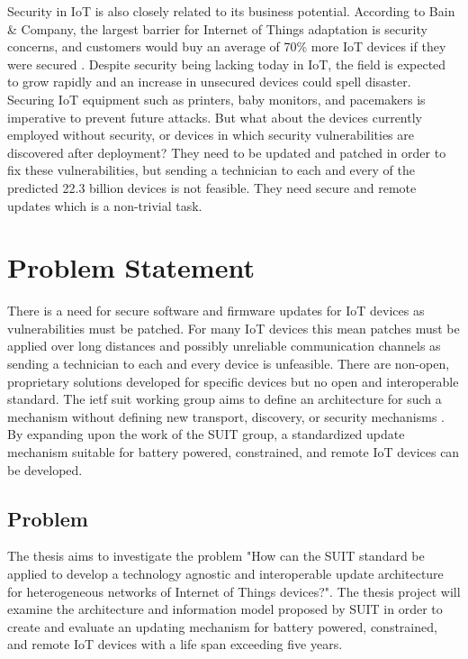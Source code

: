 \documentclass[0-thesis.tex]{subfiles}
\begin{document}
Security in IoT is also closely related to its business potential. According to Bain \&
Company, the largest barrier for Internet of Things adaptation is security concerns, and
customers would buy an average of 70\% more IoT devices if they were secured
\parencite{ali_bosche_ford_2018}. Despite security being lacking today in IoT, the field
is expected to grow rapidly and an increase in unsecured devices could spell disaster.
Securing IoT equipment such as printers, baby monitors, and pacemakers is imperative to
prevent future attacks. But what about the devices currently employed without security, or
devices in which security vulnerabilities are discovered after deployment? They need to be
updated and patched in order to fix these vulnerabilities, but sending a technician to
each and every of the predicted 22.3 billion devices is not feasible. They need secure and
remote updates which is a non-trivial task.

\section{Problem Statement}
\label{sec:problem-statement}
There is a need for secure software and firmware updates for IoT devices as
vulnerabilities must be patched. For many IoT devices this mean patches must be applied
over long distances and possibly unreliable communication channels as sending a technician
to each and every device is unfeasible. There are non-open, proprietary solutions
developed for specific devices but no open and interoperable standard. The \gls{ietf}
\gls{suit} working group aims to define an architecture for such a mechanism without
defining new transport, discovery, or security mechanisms \parencite{suit}. By expanding
upon the work of the SUIT group, a standardized update mechanism suitable for battery
powered, constrained, and remote IoT devices can be developed.

\subsection{Problem}
\label{ssec:problem}
The thesis aims to investigate the problem "How can the SUIT standard be applied to
develop a technology agnostic and interoperable update architecture for heterogeneous
networks of Internet of Things devices?". The thesis project will examine the architecture
and information model proposed by SUIT in order to create and evaluate an updating
mechanism for battery powered, constrained, and remote IoT devices with a life span
exceeding five years. 
\end{document}
